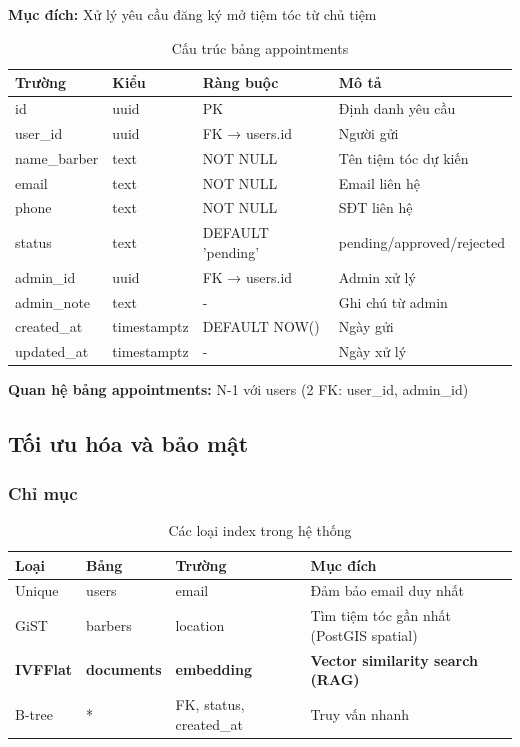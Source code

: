 \textbf{Mục đích:} Xử lý yêu cầu đăng ký mở tiệm tóc từ chủ tiệm

\begin{table}[H]
\centering
\caption{Cấu trúc bảng appointments}
\begin{tabular}{|l|l|l|p{4.5cm}|}
\hline
\textbf{Trường} & \textbf{Kiểu} & \textbf{Ràng buộc} & \textbf{Mô tả} \\
\hline
id & uuid & PK & Định danh yêu cầu \\
\hline
user\_id & uuid & FK → users.id & Người gửi \\
\hline
name\_barber & text & NOT NULL & Tên tiệm tóc dự kiến \\
\hline
email & text & NOT NULL & Email liên hệ \\
\hline
phone & text & NOT NULL & SĐT liên hệ \\
\hline
status & text & DEFAULT 'pending' & pending/approved/rejected \\
\hline
admin\_id & uuid & FK → users.id & Admin xử lý \\
\hline
admin\_note & text & - & Ghi chú từ admin \\
\hline
created\_at & timestamptz & DEFAULT NOW() & Ngày gửi \\
\hline
updated\_at & timestamptz & - & Ngày xử lý \\
\hline
\end{tabular}
\end{table}

\noindent\textbf{Quan hệ bảng appointments:} N-1 với users (2 FK: user\_id, admin\_id)

\vspace{0.5cm}

\subsection{Tối ưu hóa và bảo mật}

\subsubsection{Chỉ mục}

\begin{table}[H]
\centering
\caption{Các loại index trong hệ thống}
\begin{tabular}{|l|l|l|p{5cm}|}
\hline
\textbf{Loại} & \textbf{Bảng} & \textbf{Trường} & \textbf{Mục đích} \\
\hline
Unique & users & email & Đảm bảo email duy nhất \\
\hline
GiST & barbers & location & Tìm tiệm tóc gần nhất (PostGIS spatial) \\
\hline
\textbf{IVFFlat} & \textbf{documents} & \textbf{embedding} & \textbf{Vector similarity search (RAG)} \\
\hline
B-tree & * & FK, status, created\_at & Truy vấn nhanh \\
\hline
\end{tabular}
\end{table}

